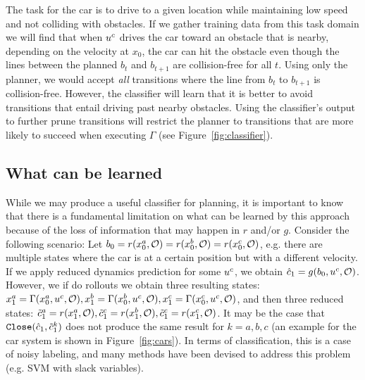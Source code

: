 The task for the car is to drive to a given location while maintaining low speed and not colliding with obstacles. If we gather training data from this task domain we will find that when $u^c$ drives the car toward an obstacle that is nearby, depending on the velocity at $x_0$, the car can hit the obstacle even though the lines between the planned $b_t$ and $b_{t+1}$ are collision-free for all $t$. Using only the planner, we would accept \textit{all} transitions where the line from $b_t$ to $b_{t+1}$ is collision-free. However, the classifier will learn that it is better to avoid transitions that entail driving past nearby obstacles. Using the classifier's output to further prune transitions will restrict the planner to transitions that are more likely to succeed when executing $\Gamma$ (see Figure~\ref{fig:classifier}).



\subsection{What can be learned}

While we may produce a useful classifier for planning, it is important to know that there is a fundamental limitation on what can be learned by this approach because of the loss of information that may happen in $r$ and/or $g$. Consider the following scenario: Let $b_0 = r(x_0^a,\mathcal{O}) = r(x_0^b,\mathcal{O}) = r(x_0^c,\mathcal{O})$, e.g. there are multiple states where the car is at a certain position but with a different velocity. If we apply reduced dynamics prediction for some $u^c$, we obtain $\hat{c}_1 = g(b_0,u^c,\mathcal{O})$. However, we if do rollouts we obtain three resulting states: $x_1^a = \Gamma(x_0^a,u^c,\mathcal{O}), x_1^b = \Gamma(x_0^b,u^c,\mathcal{O}), x_1^c = \Gamma(x_0^c,u^c,\mathcal{O})$, and then three reduced states: $\tilde{c}_1^a = r(x_1^a,\mathcal{O}),\tilde{c}_1^c = r(x_1^b,\mathcal{O}), \tilde{c}_1^c = r(x_1^c,\mathcal{O})$. It may be the case that $\texttt{Close}(\hat{c}_1, \tilde{c}_1^k)$ does not produce the same result for $k={a,b,c}$ (an example for the car system is shown in Figure~\ref{fig:cars}). In terms of classification, this is a case of noisy labeling, and many methods have been devised to address this problem (e.g. SVM with slack variables). %

